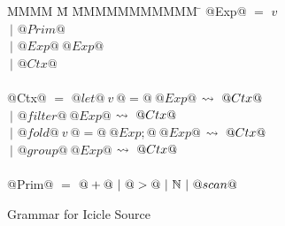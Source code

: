 
\begin{figure}

\begin{tabbing}
MMMM \= M \= MMMMMMMMMMM \= \kill
@Exp@
    \> $=$  \> $v$ \\
    \> $~|$ \> $@Prim@$ \\
    \> $~|$ \> $@Exp@~@Exp@$ \\
    \> $~|$ \> $@Ctx@$ \\
\\
@Ctx@
    \> $=$  \> $@let@~v~@=@~@Exp@$
            \> $\leadsto~@Ctx@$ \\
    \> $~|$ \> $@filter@~@Exp@$
            \> $\leadsto~@Ctx@$ \\
    \> $~|$ \> $@fold@~v~@=@~@Exp;@~@Exp@$
            \> $\leadsto~@Ctx@$ \\

    \> $~|$ \> $@group@~@Exp@$
            \> $\leadsto~@Ctx@$ \\
\\
@Prim@
    \> $=$  \> $@+@~|~@>@~|~\mathbb{N}~|~@scan@$ \\
\end{tabbing}


\caption{Grammar for Icicle Source}
\label{fig:source:grammar}
\end{figure}


